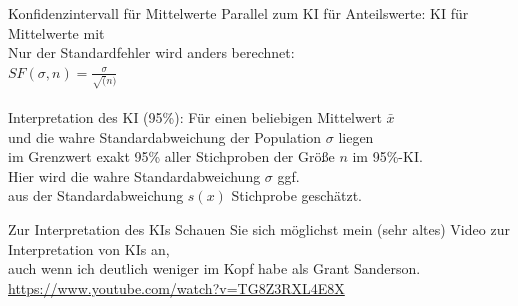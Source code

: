 \begin{frame}
  {Konfidenzintervall für Mittelwerte}
  \onslide<+->
  \onslide<+->
  Parallel zum KI für Anteilswerte: \alert{KI für Mittelwerte} mit \\
  \Doppelzeile
  \onslide<+->
  \centering 
  Nur der Standardfehler wird anders berechnet:\\
  \Zeile
  \alert{$SF(\sigma, n)=\frac{\sigma}{\sqrt(n)}$}\\
  \Halbzeile
  \\
  \onslide<+->
  \Doppelzeile
  Interpretation des KI (95\%): Für einen \alert{beliebigen Mittelwert $\bar{x}$}\\
  und die \alert{wahre Standardabweichung der Population $\sigma$} liegen\\
  im Grenzwert exakt \alert{95\% aller Stichproben der Größe $n$ im 95\%-KI}.\\
  \Zeile
  Hier wird die wahre Standardabweichung $\sigma$ ggf.\\
  aus der Standardabweichung $s(x)$ Stichprobe geschätzt.
\end{frame}

\begin{frame}
  {Zur Interpretation des KIs}
  \onslide<+->
  \onslide<+->
  \centering 
  Schauen Sie sich möglichst mein (sehr altes) Video zur Interpretation von KIs an,\\
  auch wenn ich deutlich weniger im Kopf habe als Grant Sanderson.\\
  \Zeile
  \url{https://www.youtube.com/watch?v=TG8Z3RXL4E8X}
\end{frame}


